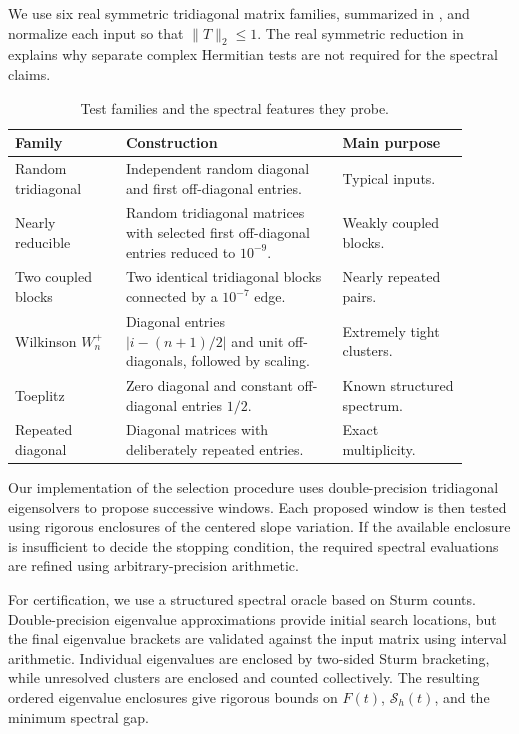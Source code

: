 \documentclass[10pt,a4paper]{article}
\begin{document}
We use six real symmetric tridiagonal matrix families, summarized in
, and normalize each input so that
$\|T\|_2\leq1$. The real symmetric reduction in 
explains why separate complex Hermitian tests are not required for the
spectral claims.
\begin{table}[t]
\centering\small
\caption{Test families and the spectral features they probe.}
\label{tab:test-families}
\begin{tabular}{p{0.22\linewidth}p{0.43\linewidth}p{0.25\linewidth}}
\hline
Family & Construction & Main purpose\\
\hline
Random tridiagonal & Independent random diagonal and first off-diagonal entries.
& Typical inputs.\\
Nearly reducible & Random tridiagonal matrices with selected first
 off-diagonal entries reduced to $10^{-9}$. & Weakly coupled blocks.\\
Two coupled blocks & Two identical tridiagonal blocks connected by a
 $10^{-7}$ edge. & Nearly repeated pairs.\\
Wilkinson $W_n^+$ & Diagonal entries $|i-(n+1)/2|$ and unit off-diagonals,
 followed by scaling. & Extremely tight clusters.\\
Toeplitz & Zero diagonal and constant off-diagonal entries $1/2$.
 & Known structured spectrum.\\
Repeated diagonal & Diagonal matrices with deliberately repeated entries.
 & Exact multiplicity.\\
\hline
\end{tabular}
\end{table}

Our implementation of the selection procedure uses double-precision
tridiagonal eigensolvers to propose successive windows. Each proposed
window is then tested using rigorous enclosures of the centered
slope variation. If the available enclosure is insufficient to
decide the stopping condition, the required spectral evaluations
are refined using arbitrary-precision arithmetic.

For certification, we use a structured spectral oracle based on
Sturm counts. Double-precision eigenvalue approximations provide
initial search locations, but the final eigenvalue brackets are
validated against the input matrix using interval arithmetic.
Individual eigenvalues are enclosed by two-sided Sturm bracketing,
while unresolved clusters are enclosed and counted collectively.
The resulting ordered eigenvalue enclosures give rigorous bounds
on $F(t)$, $\mathcal S_h(t)$, and the minimum spectral gap.
\end{document}
